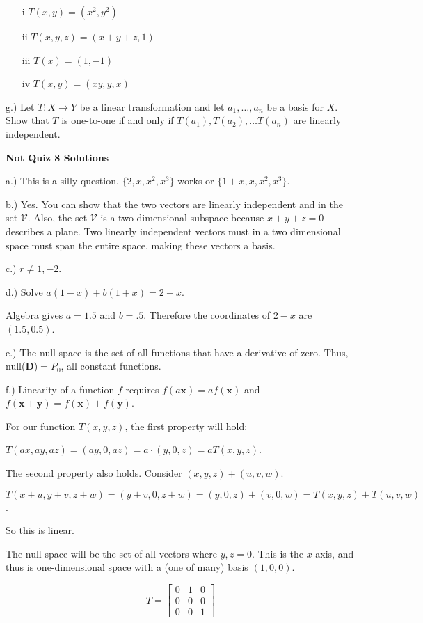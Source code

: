 \documentclass{article}
\begin{document}
\begin{enumerate}
\item[i] $T(x,y)=(x^2, y^2)$
\item[ii] $T(x,y,z)=(x+y+z,1)$
\item[iii] $T(x)=(1,-1)$
\item[iv] $T(x,y)=(xy,y,x)$
\end{enumerate}

g.) Let $T:X\rightarrow Y$ be a linear transformation and let $a_1,\dots,a_n$ be a basis for $X$. Show that $T$ is one-to-one if and only if $T(a_1), T(a_2),\dots T(a_n)$ are linearly independent.

\pagebreak

\textbf{Not Quiz 8 Solutions}

a.) This is a silly question. $\{2,x,x^2,x^3\}$ works or $\{1+x,x,x^2,x^3\}$.

b.) Yes. You can show that the two vectors are linearly independent and in the set $\mathcal{V}$. Also, the set $\mathcal{V}$ is a two-dimensional subspace because $x+y+z=0$ describes a plane. Two linearly independent vectors must in a two dimensional space must span the entire space, making these vectors a basis.

c.) $r\neq 1, -2$. 

d.) Solve $a(1-x)+b(1+x)=2-x$. 

Algebra gives $a=1.5$ and $b=.5$. Therefore the coordinates of $2-x$ are $(1.5,0.5)$.

e.) The null space is the set of all functions that have a derivative of zero. Thus, null($\mathbf{D}$)$=P_0$, all constant functions. 

f.) Linearity of a function $f$ requires $f(a\mathbf{x})=af(\mathbf{x})$ and $f(\mathbf{x}+\mathbf{y})=f(\mathbf{x})+f(\mathbf{y})$.


For our function $T(x,y,z)$, the first property will hold:

$T(ax,ay,az)=(ay,0,az)=a\cdot (y,0,z)=aT(x,y,z)$. 


The second property also holds. Consider $(x,y,z)+(u,v,w)$.

$T(x+u,y+v,z+w)=(y+v,0,z+w)=(y,0,z)+(v,0,w)=T(x,y,z)+T(u,v,w)$.

So this is linear.

The null space will be the set of all vectors where $y,z=0$. This is the $x$-axis, and thus is one-dimensional space with a (one of many) basis $(1,0,0)$. 


$$T=\left[ \begin{array}{ccc}
0 & 1 & 0\\
0 & 0 & 0\\
0 & 0 & 1
\end{array} \right]$$
\end{document}
